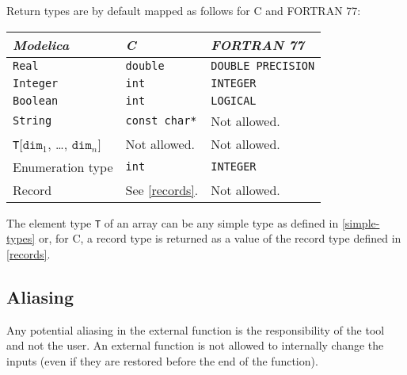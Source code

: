Return types are by default mapped as follows for C and FORTRAN 77:

\begin{longtable}[]{|l|l|l|}
\hline
\emph{Modelica} & \emph{C} & \emph{FORTRAN 77}\\ \hline
\endhead
\lstinline!Real! & \lstinline!double! & \lstinline!DOUBLE PRECISION!\\ \hline
\lstinline!Integer! & \lstinline!int! & \lstinline!INTEGER!\\ \hline
\lstinline!Boolean! & \lstinline!int! & \lstinline!LOGICAL!\\ \hline
\lstinline!String! & \lstinline!const char*! & Not allowed.\\ \hline
\texttt{T}{[}$\texttt{dim}_1$, \ldots{}, $\texttt{dim}_{n}${]} & Not allowed. & Not allowed.\\ \hline
Enumeration type & \lstinline!int! & \lstinline!INTEGER!\\ \hline
Record & See \autoref{records}. & Not allowed.\\ \hline
\end{longtable}

The element type \lstinline!T! of an array can be any simple type as defined in
\autoref{simple-types} or, for C, a record type is returned as a value of the
record type defined in \autoref{records}.

\subsection{Aliasing}

Any potential aliasing in the external function is the responsibility of
the tool and not the user. An external function is not allowed to
internally change the inputs (even if they are restored before the end
of the function).

